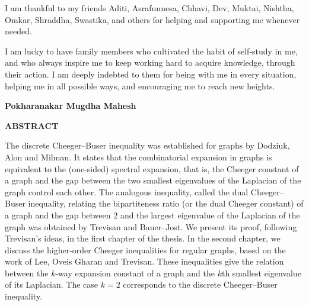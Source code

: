 \documentclass[12pt,a4paper,bold]{thesis}
\theoremstyle{definition}
\newcommand{\head}[1]{\newpage
\phantomsection %
\addcontentsline{toc}{chapter}{#1}
\vspace{3em}
\begin{center}
\LARGE{\MakeUppercase{\textbf{#1}}}
\end{center}
\vspace{3em}
}
\newcommand{\studentname}{Pokharanakar Mugdha Mahesh}
\begin{document}
I am thankful to my friends Aditi, Asrafunnesa, Chhavi, Dev, Muktai, Nishtha, 
Omkar, Shraddha, Swastika, and others for helping and supporting me whenever needed.

I am lucky to have family members who cultivated the habit of self-study in me,
and who always inspire me to keep working hard to acquire knowledge, through 
their action. I am deeply indebted to them for being with me in every situation, 
helping me in all possible ways, and encouraging me to reach new heights.

\vspace{7em}

\begin{flushright}
    {\bf \studentname}
\end{flushright}

\head{Abstract}



The discrete Cheeger--Buser inequality was established for graphs by Dodziuk, 
Alon and Milman. It states that the combinatorial expansion in graphs is equivalent to
the (one-sided) spectral expansion, that is, the Cheeger constant of a graph and
the gap between the two smallest eigenvalues of the Laplacian of the graph 
control each other. The analogous inequality, called the dual Cheeger--Buser
inequality, relating the bipartiteness ratio (or the dual Cheeger constant) 
of a graph and the gap between $2$ and the largest eigenvalue of the Laplacian 
of the graph was obtained by Trevisan and Bauer--Jost. We present its proof, 
following Trevisan's ideas, in the first chapter of the thesis. In the second chapter,
we discuss the higher-order Cheeger inequalities for regular graphs, based on 
the work of Lee, Oveis Gharan and Trevisan. These inequalities give the relation 
between the $k$-way expansion constant of a graph and the $k$th smallest eigenvalue 
of its Laplacian. The case $k = 2$ corresponds to the discrete Cheeger--Buser inequality.
\end{document}
